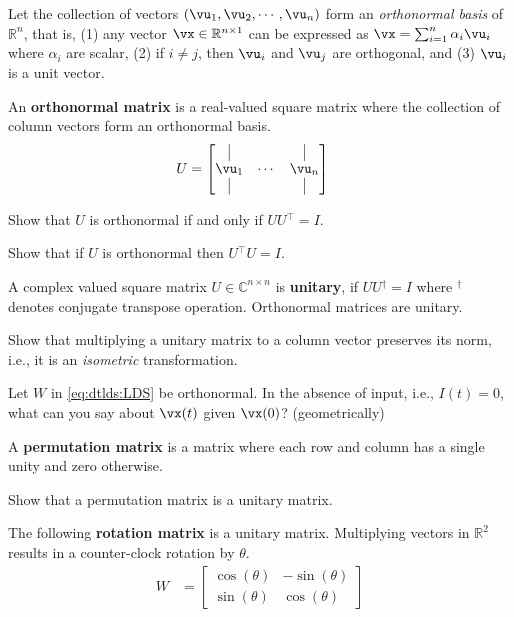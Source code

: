 \documentclass[a4paper,11pt]{exam}
\newcounter{ct}
\newcommand{\trp}{{^\top}} %
\newcommand{\ctrp}{{^\dagger}} %
\newcommand{\field}[1]{\ensuremath{\mathbb{#1}}}
\newcommand{\reals}{\field{R}}
\newcommand{\complex}{\field{C}}
\begin{document}
\begin{questions}
Let the collection of vectors $(\vu_1, \vu_2, \cdots, \vu_n)$ form an \textit{orthonormal basis} of $\reals^n$, that is,
(1) any vector $\vx \in \reals^{n \times 1}$ can be expressed as $\vx = \sum_{i=1}^n \alpha_i \vu_i$ where $\alpha_i$ are scalar,
(2) if $i \neq j$, then $\vu_i$ and $\vu_j$ are orthogonal,
and
(3) $\vu_i$ is a unit vector.

An \textbf{orthonormal matrix} is a real-valued square matrix where the collection of column vectors form an orthonormal basis.
\begin{align}\label{eq:LA:orthonormal}
U &=
    \begin{bmatrix}
	\kern.3em\vline\kern.3em
	&
	&
	\kern.3em\vline\kern.3em
	\\
	\vu_1 & \cdots & \vu_n \\
	\kern.3em\vline\kern.3em
	&
	&
	\kern.3em\vline\kern.3em
    \end{bmatrix}
\end{align}

\clearpage
\question Show that $U$ is orthonormal if and only if $U U\trp = I$.

\question Show that if $U$ is orthonormal then $U\trp U = I$.

A complex valued square matrix $U \in \complex^{n \times n}$ is \textbf{unitary}, if $U U\ctrp = I$ where $\ctrp$ denotes conjugate transpose operation.
Orthonormal matrices are unitary.

\question Show that multiplying a unitary matrix to a column vector preserves its norm, i.e., it is an \emph{isometric} transformation.

\question Let $W$ in \eqref{eq:dtlds:LDS} be orthonormal. In the absence of input, i.e., $I(t) = 0$, what can you say about $\vx(t)$ given $\vx(0)$? (geometrically)

A \textbf{permutation matrix} is a matrix where each row and column has a single unity and zero otherwise.

\question Show that a permutation matrix is a unitary matrix.

\clearpage
\question The following \textbf{rotation matrix} is a unitary matrix. Multiplying vectors in $\reals^2$ results in a counter-clock rotation by $\theta$.
\begin{align}\label{eq:LA:rotation}
    W &=
    \begin{bmatrix}
	\cos(\theta) & -\sin(\theta)\\
	\sin(\theta) & \cos(\theta)
    \end{bmatrix}
\end{align}
\begin{parts}

\end{parts}
\end{questions}
\end{document}
